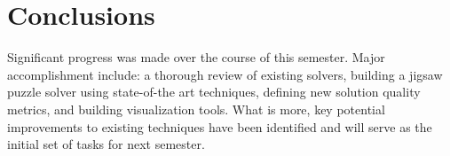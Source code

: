 \documentclass{report}
\begin{document}

\pagebreak
\section{Conclusions}\label{sec:conclusions}

Significant progress was made over the course of this semester.  Major accomplishment include: a thorough review of existing solvers, building a jigsaw puzzle solver using state-of-the art techniques, defining new solution quality metrics, and building visualization tools.  What is more, key potential improvements to existing techniques have been identified and will serve as the initial set of tasks for next semester.











\pagebreak


\end{document}
